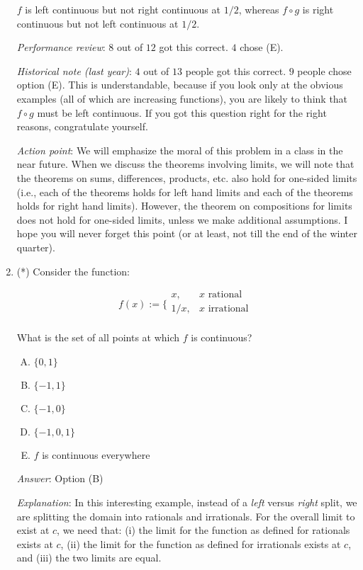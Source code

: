 \documentclass[10pt]{amsart}
\begin{document}
\begin{enumerate}
  $f$ is left continuous but not right continuous at $1/2$, whereas $f
  \circ g$ is right continuous but not left continuous at $1/2$.

  {\em Performance review}: $8$ out of $12$ got this correct. $4$
  chose (E).

  {\em Historical note (last year)}: $4$ out of $13$ people got this correct. $9$
  people chose option (E). This is understandable, because if you look
  only at the obvious examples (all of which are increasing
  functions), you are likely to think that $f \circ g$ must be left
  continuous. If you got this question right for the right reasons,
  congratulate yourself.

  {\em Action point}: We will emphasize the moral of this problem in a
  class in the near future. When we discuss the theorems involving
  limits, we will note that the theorems on sums, differences,
  products, etc. also hold for one-sided limits (i.e., each of the
  theorems holds for left hand limits and each of the theorems holds
  for right hand limits). However, the theorem on compositions for
  limits does not hold for one-sided limits, unless we make additional
  assumptions. I hope you will never forget this point (or at least,
  not till the end of the winter quarter).

\item (*) Consider the function:

  $$f(x) := \lbrace\begin{array}{rl} x, & x \text{ rational }\\1/x, & x \text{ irrational }\\\end{array}$$

  What is the set of all points at which $f$ is continuous?

  \begin{enumerate}[(A)]
  \item $\{ 0, 1 \}$
  \item $\{ -1,1 \}$
  \item $\{-1,0 \}$
  \item $\{ -1,0,1 \}$
  \item $f$ is continuous everywhere
  \end{enumerate}

  {\em Answer}: Option (B)

  {\em Explanation}: In this interesting example, instead of a {\em
  left} versus {\em right} split, we are splitting the domain into
  rationals and irrationals. For the overall limit to exist at $c$, we
  need that: (i) the limit for the function as defined for rationals
  exists at $c$, (ii) the limit for the function as defined for
  irrationals exists at $c$, and (iii) the two limits are equal.


\end{enumerate}
\end{document}
